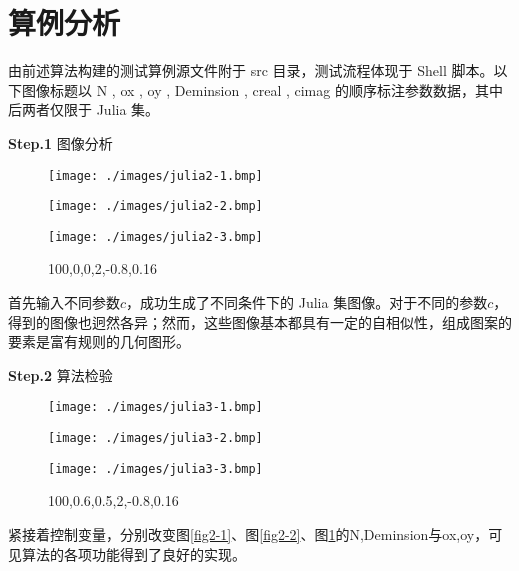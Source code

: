 \section{算例分析}

由前述算法构建的测试算例源文件附于 src 目录，测试流程体现于 Shell 脚本。以下图像标题以 N , ox , oy , Deminsion , creal , cimag 的顺序标注参数数据，其中后两者仅限于 Julia 集。

\textbf{Step.1} 图像分析

\begin{figure}[htbp]
\centering
\begin{minipage}{0.33\linewidth}
\centering
\texttt{[image: ./images/julia2-1.bmp]}
\caption{100,0,0,2,-0.4,0.6}
\label{fig2-1}
\end{minipage}\hfill
\begin{minipage}{0.33\linewidth}
\centering
\texttt{[image: ./images/julia2-2.bmp]}
\caption{100,0,0,2,-0.6,-0.4}
\label{fig2-2}
\end{minipage}\hfill
\begin{minipage}{0.33\linewidth}
\centering
\texttt{[image: ./images/julia2-3.bmp]}
\caption{100,0,0,2,-0.8,0.16}
\label{fig2-3}
\end{minipage}
\end{figure}

首先输入不同参数$c$，成功生成了不同条件下的 Julia 集图像。对于不同的参数$c$，得到的图像也迥然各异；然而，这些图像基本都具有一定的自相似性，组成图案的要素是富有规则的几何图形。

\textbf{Step.2} 算法检验

\begin{figure}[htbp]
\centering
\begin{minipage}{0.33\linewidth}
\centering
\texttt{[image: ./images/julia3-1.bmp]}
\caption{40,0,0,2,-0.4,0.6}
\label{fig3-1}
\end{minipage}\hfill
\begin{minipage}{0.33\linewidth}
\centering
\texttt{[image: ./images/julia3-2.bmp]}
\caption{100,0,0,1,-0.6,-0.4}
\label{fig3-2}
\end{minipage}\hfill
\begin{minipage}{0.33\linewidth}
\centering
\texttt{[image: ./images/julia3-3.bmp]}
\caption{100,0.6,0.5,2,-0.8,0.16}
\label{fig3-3}
\end{minipage}
\end{figure}

紧接着控制变量，分别改变图\ref{fig2-1}、图\ref{fig2-2}、图\ref{fig2-3}的N,Deminsion与ox,oy，可见算法的各项功能得到了良好的实现。

